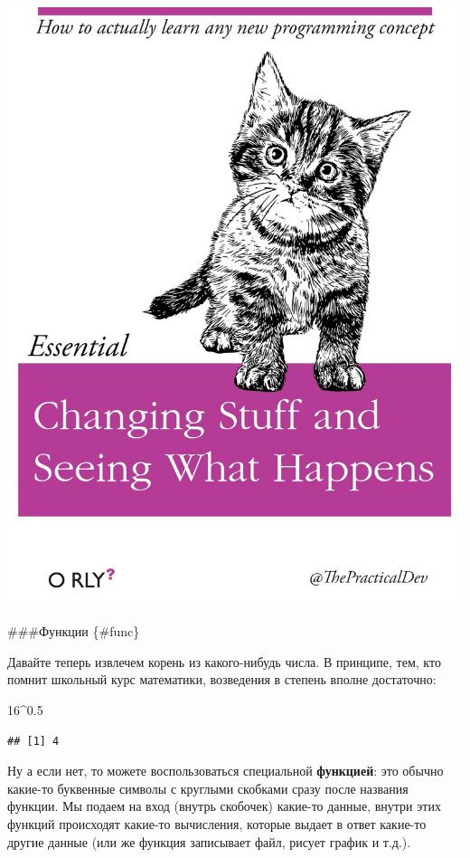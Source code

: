 \documentclass[]{book}
\newenvironment{Shaded}{\begin{snugshade}}{\end{snugshade}}
\newcommand{\DecValTok}[1]{\textcolor[rgb]{0.00,0.00,0.81}{#1}}
\newcommand{\FloatTok}[1]{\textcolor[rgb]{0.00,0.00,0.81}{#1}}
\newcommand{\OperatorTok}[1]{\textcolor[rgb]{0.81,0.36,0.00}{\textbf{#1}}}
\begin{document}
\includegraphics{images/ThePracticalDev_2016-Apr-13.jpg}

\#\#\#Функции \{\#func\}

Давайте теперь извлечем корень из какого-нибудь числа. В принципе, тем, кто помнит школьный курс математики, возведения в степень вполне достаточно:

\begin{Shaded}
\begin{Highlighting}[]
\DecValTok{16}\OperatorTok{^}\FloatTok{0.5}
\end{Highlighting}
\end{Shaded}

\begin{verbatim}
## [1] 4
\end{verbatim}

Ну а если нет, то можете воспользоваться специальной \textbf{функцией}: это обычно какие-то буквенные символы с круглыми скобками сразу после названия функции. Мы подаем на вход (внутрь скобочек) какие-то данные, внутри этих функций происходят какие-то вычисления, которые выдает в ответ какие-то другие данные (или же функция записывает файл, рисует график и т.д.).
\end{document}
